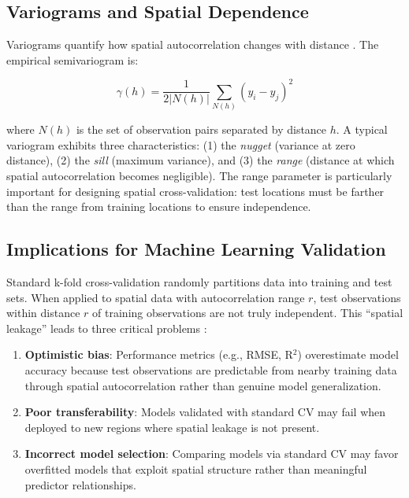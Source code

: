 \documentclass[a4paper,fleqn]{cas-sc}
\begin{document}
\subsection{Variograms and Spatial Dependence}

Variograms quantify how spatial autocorrelation changes with distance \citep{matheron1963principles}. The empirical semivariogram is:

\begin{equation}
\gamma(h) = \frac{1}{2|N(h)|} \sum_{N(h)} (y_i - y_j)^2
\end{equation}

where $N(h)$ is the set of observation pairs separated by distance $h$. A typical variogram exhibits three characteristics: (1) the \textit{nugget} (variance at zero distance), (2) the \textit{sill} (maximum variance), and (3) the \textit{range} (distance at which spatial autocorrelation becomes negligible). The range parameter is particularly important for designing spatial cross-validation: test locations must be farther than the range from training locations to ensure independence.

\subsection{Implications for Machine Learning Validation}

Standard k-fold cross-validation randomly partitions data into training and test sets. When applied to spatial data with autocorrelation range $r$, test observations within distance $r$ of training observations are not truly independent. This ``spatial leakage'' leads to three critical problems \citep{roberts2017cross}:

\begin{enumerate}
\item \textbf{Optimistic bias}: Performance metrics (e.g., RMSE, R$^2$) overestimate model accuracy because test observations are predictable from nearby training data through spatial autocorrelation rather than genuine model generalization.
\item \textbf{Poor transferability}: Models validated with standard CV may fail when deployed to new regions where spatial leakage is not present.
\item \textbf{Incorrect model selection}: Comparing models via standard CV may favor overfitted models that exploit spatial structure rather than meaningful predictor relationships.
\end{enumerate}
\end{document}
